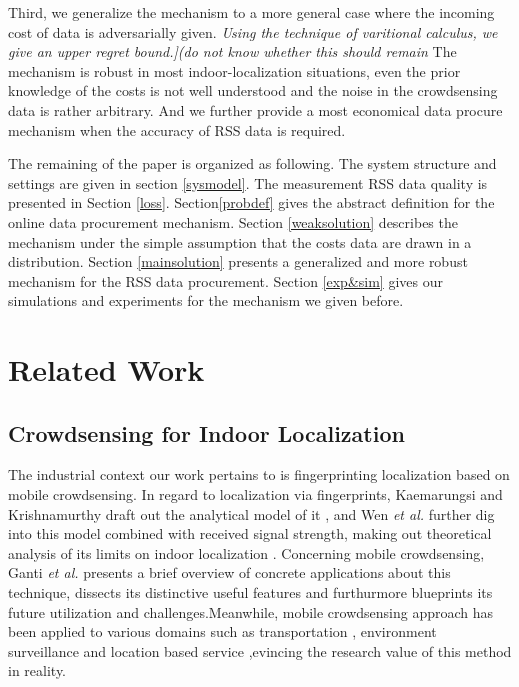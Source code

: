 \documentclass[10pt,conference,compsocconf,letterpaper]{IEEEtran}
\begin{document}
Third, we generalize the mechanism to a more general case where the incoming cost of data is adversarially given. \emph{Using the technique of varitional calculus, we give an upper regret bound.](do not know whether this should remain} The mechanism is robust in most indoor-localization situations, even the prior knowledge of the costs is not well understood and the noise in the crowdsensing data is rather arbitrary. And we further provide a most economical data procure mechanism when the accuracy of RSS data is required.

The remaining of the paper is organized as following. The system structure and settings are given in section \ref{sysmodel}. The measurement  RSS data quality is presented in Section \ref{loss}. Section\ref{probdef}  gives the abstract definition for the online data procurement mechanism. Section \ref{weaksolution} describes the mechanism under the simple assumption that the costs data are drawn in a distribution. Section \ref{mainsolution} presents a generalized and more robust mechanism for the RSS data procurement. Section \ref{exp&sim} gives our simulations and experiments for the mechanism we given before.



\section{Related Work \label{sectionrelatedwork}}
\subsection{Crowdsensing for Indoor Localization}

The industrial context our work pertains to is fingerprinting localization based on mobile crowdsensing. In regard to localization via fingerprints, Kaemarungsi and Krishnamurthy draft out the analytical model of it \cite{kaemarungsi2004modeling}, and Wen \emph{et al.} \cite{}further dig into this model combined with received signal strength, making out theoretical analysis of its limits on indoor localization \cite{wen2015fundamental}. Concerning mobile crowdsensing, Ganti \emph{et al.} presents a brief overview of concrete applications about this technique, dissects its distinctive useful features and furthurmore blueprints its future utilization and challenges\cite{ganti2011mobile}.Meanwhile, mobile crowdsensing approach has been applied to various domains such as transportation \cite{transportation2}, environment surveillance \cite{environment,environment2} and location based service \cite{lbs, lbs2},evincing the research value of this method in reality.
\end{document}
